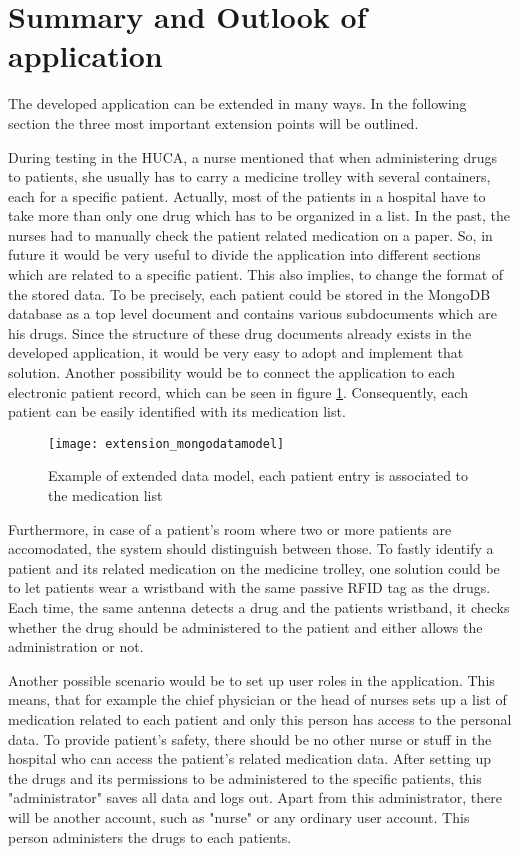 \section{Summary and Outlook of application}

The developed application can be extended in many ways. In the following section the three most important extension points will be outlined.

During testing in the HUCA, a nurse mentioned that when administering drugs to patients, she usually has to carry a medicine trolley with several containers, each for a specific patient. Actually, most of the patients in a hospital have to take more than only one drug which has to be organized in a list. In the past, the nurses had to manually check the patient related medication on a paper.
So, in future it would be very useful to divide the application into different sections which are related to a specific patient. This also implies, to change the format of the stored data. To be precisely, each patient could be stored in the MongoDB database as a top level document and contains various subdocuments which are his drugs. Since the structure of these drug documents already exists in the developed application, it would be very easy to adopt and implement that solution. Another possibility would be to connect the application to each electronic patient record, which can be seen in figure \ref{fig:newdatamodel}. Consequently, each patient can be easily identified with its medication list.

\begin{figure}
\centering
\texttt{[image: extension\_mongodatamodel]} 
\caption{\label{fig:newdatamodel}Example of extended data model, each patient entry is associated to the medication list} 
\end{figure}

Furthermore, in case of a patient's room where two or more patients are accomodated, the system should distinguish between those. To fastly identify a patient and its related medication on the medicine trolley, one solution could be to let patients wear a wristband with the same passive RFID tag as the drugs. Each time, the same antenna detects a drug and the patients wristband, it checks whether the drug should be administered to the patient and either allows the administration or not.

Another possible scenario would be to set up user roles in the application. This means, that for example the chief physician or the head of nurses sets up a list of medication related to each patient and only this person has access to the personal data. To provide patient's safety, there should be no other nurse or stuff in the hospital who can access the patient's related medication data. After setting up the drugs and its permissions to be administered to the specific patients, this "administrator" saves all data and logs out. 
Apart from this administrator, there will be another account, such as "nurse" or any ordinary user account. This person administers the drugs to each patients.